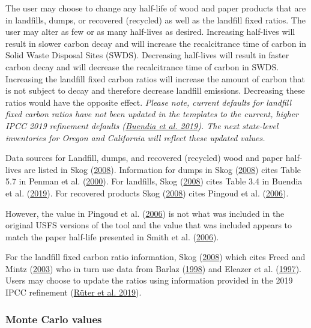 \documentclass[
  openany]{book}
\begin{document}
The user may choose to change any half-life of wood and paper products
that are in landfills, dumps, or recovered (recycled) as well as the
landfill fixed ratios. The user may alter as few or as many half-lives
as desired. Increasing half-lives will result in slower carbon decay and
will increase the recalcitrance time of carbon in Solid Waste Disposal
Sites (SWDS). Decreasing half-lives will result in faster carbon decay
and will decrease the recalcitrance time of carbon in SWDS. Increasing
the landfill fixed carbon ratios will increase the amount of carbon that
is not subject to decay and therefore decrease landfill emissions.
Decreasing these ratios would have the opposite effect. \emph{Please
note, current defaults for landfill fixed carbon ratios have not been
updated in the templates to the current, higher IPCC 2019 refinement
defaults (\protect\hyperlink{ref-buendia2019}{Buendia et al. 2019}). The
next state-level inventories for Oregon and California will reflect
these updated values.}

Data sources for Landfill, dumps, and recovered (recycled) wood and
paper half-lives are listed in Skog
(\protect\hyperlink{ref-skog2008}{2008}). Information for dumps in Skog
(\protect\hyperlink{ref-skog2008}{2008}) cites Table 5.7 in Penman et
al. (\protect\hyperlink{ref-penman2000}{2000}). For landfills, Skog
(\protect\hyperlink{ref-skog2008}{2008}) cites Table 3.4 in Buendia et
al. (\protect\hyperlink{ref-buendia2019}{2019}). For recovered products
Skog (\protect\hyperlink{ref-skog2008}{2008}) cites Pingoud et al.
(\protect\hyperlink{ref-pingoud2006}{2006}).

However, the value in Pingoud et al.
(\protect\hyperlink{ref-pingoud2006}{2006}) is not what was included in
the original USFS versions of the tool and the value that was included
appears to match the paper half-life presented in Smith et al.
(\protect\hyperlink{ref-smith2006}{2006}).

For the landfill fixed carbon ratio information, Skog
(\protect\hyperlink{ref-skog2008}{2008}) which cites Freed and Mintz
(\protect\hyperlink{ref-freed2003}{2003}) who in turn use data from
Barlaz (\protect\hyperlink{ref-barlaz1998}{1998}) and Eleazer et al.
(\protect\hyperlink{ref-eleazer1997}{1997}). Users may choose to update
the ratios using information provided in the 2019 IPCC refinement
(\protect\hyperlink{ref-ruter2019}{Rüter et al. 2019}).

\hypertarget{own-prov-input-mc}{%
\subsubsection{Monte Carlo values}\label{own-prov-input-mc}}
\end{document}
